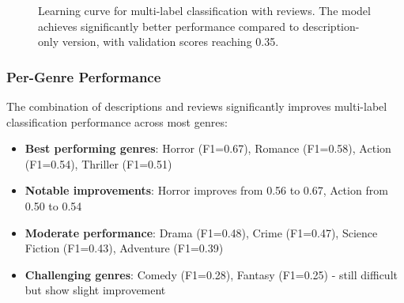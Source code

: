 \documentclass[12pt,a4paper]{article}
\begin{document}
\begin{figure}[h]
\centering
{}
\caption{Learning curve for multi-label classification with reviews. The model achieves significantly better performance compared to description-only version, with validation scores reaching 0.35.}
\label{fig:exp4_learning}
\end{figure}

\subsubsection{Per-Genre Performance}

The combination of descriptions and reviews significantly improves multi-label classification performance across most genres:

\begin{itemize}
    \item \textbf{Best performing genres}: Horror (F1=0.67), Romance (F1=0.58), Action (F1=0.54), Thriller (F1=0.51)
    \item \textbf{Notable improvements}: Horror improves from 0.56 to 0.67, Action from 0.50 to 0.54
    \item \textbf{Moderate performance}: Drama (F1=0.48), Crime (F1=0.47), Science Fiction (F1=0.43), Adventure (F1=0.39)
    \item \textbf{Challenging genres}: Comedy (F1=0.28), Fantasy (F1=0.25) - still difficult but show slight improvement
\end{itemize}
\end{document}
